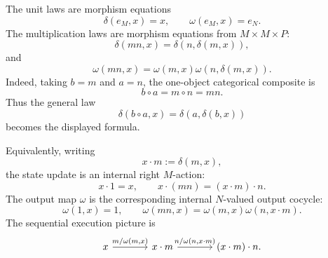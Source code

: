 The unit laws are morphism equations
\[
    \delta(e_M,x)=x,
    \qquad
    \omega(e_M,x)=e_N.
\]
The multiplication laws are morphism equations from \(M\times M\times P\):
\[
    \delta(mn,x)=\delta(n,\delta(m,x)),
\]
and
\[
    \omega(mn,x)=\omega(m,x)\omega(n,\delta(m,x)).
\]
Indeed, taking \(b=m\) and \(a=n\), the one-object categorical composite is
\[
    b\circ a=m\circ n=mn.
\]
Thus the general law
\[
    \delta(b\circ a,x)=\delta(a,\delta(b,x))
\]
becomes the displayed formula.

Equivalently, writing
\[
    x\cdot m:=\delta(m,x),
\]
the state update is an internal right \(M\)-action:
\[
    x\cdot 1=x,
    \qquad
    x\cdot(mn)=(x\cdot m)\cdot n.
\]
The output map \(\omega\) is the corresponding internal \(N\)-valued output
cocycle:
\[
    \omega(1,x)=1,
    \qquad
    \omega(mn,x)=\omega(m,x)\omega(n,x\cdot m).
\]
The sequential execution picture is
\[
    \begin{tikzcd}[column sep=large]
            x
                \arrow[r, "{m/\omega(m,x)}"]
        &
            x\cdot m
                \arrow[r, "{n/\omega(n,x\cdot m)}"]
        &
            (x\cdot m)\cdot n.
    \end{tikzcd}
\]


